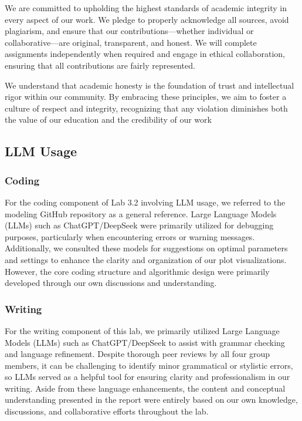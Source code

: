 \documentclass[11pt,letterpaper]{article}
\begin{document}
We are committed to upholding the highest standards of academic integrity in every aspect of our work. We pledge to properly acknowledge all sources, avoid plagiarism, and ensure that our contributions—whether individual or collaborative—are original, transparent, and honest. We will complete assignments independently when required and engage in ethical collaboration, ensuring that all contributions are fairly represented.

We understand that academic honesty is the foundation of trust and intellectual rigor within our community. By embracing these principles, we aim to foster a culture of respect and integrity, recognizing that any violation diminishes both the value of our education and the credibility of our work

\vspace{1em} %
\subsection{LLM Usage}
\vspace{0.5em} %

\subsubsection*{Coding}
\vspace{0.5em} %

For the coding component of Lab 3.2 involving LLM usage, we referred to the modeling GitHub repository as a general reference. Large Language Models (LLMs) such as ChatGPT/DeepSeek were primarily utilized for debugging purposes, particularly when encountering errors or warning messages. Additionally, we consulted these models for suggestions on optimal parameters and settings to enhance the clarity and organization of our plot visualizations. However, the core coding structure and algorithmic design were primarily developed through our own discussions and understanding.

\vspace{1em} %
\subsubsection*{Writing}
\vspace{0.5em} %

For the writing component of this lab, we primarily utilized Large Language Models (LLMs) such as ChatGPT/DeepSeek to assist with grammar checking and language refinement. Despite thorough peer reviews by all four group members, it can be challenging to identify minor grammatical or stylistic errors, so LLMs served as a helpful tool for ensuring clarity and professionalism in our writing. Aside from these language enhancements, the content and conceptual understanding presented in the report were entirely based on our own knowledge, discussions, and collaborative efforts throughout the lab.
\end{document}
